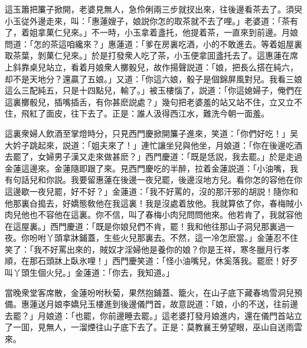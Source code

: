 這玉簫把簾子掀開，老婆見無人，急伶俐兩三步就扠出來，往後邊看茶去了。須臾小玉従外邊走來，叫：「惠蓮嫂子，娘説你怎的取茶就不去了哩。」老婆道：「茶有了，着姐拿菓仁兒來。」不一時，小玉拿着盞托，他提着茶，一直來到前邊。月娘問道：「怎的茶這咱纔來？」惠蓮道：「爹在房裏吃酒，小的不敢進去。等着姐屋裏取茶葉，剝菓仁兒來。」於是打發衆人吃了茶，小玉便拿囬盞托去了。這惠蓮在席上斜靠桌兒站立，看着月娘衆人擲骰兒，故作揚聲説道：「娘，把長么搭在純六，却不是天地分？還贏了五娘。」又道：「你這六娘，骰子是個錦屏風對兒。我看三娘這么三配純五，只是十四點兒，輸了。」被玉樓惱了，説道：「你這媳婦子，俺們在這裏擲骰兒，插嘴插舌，有你甚麽説處？」幾句把老婆羞的站又站不住，立又立不住，飛紅了面皮，往下去了。正是：誰人汲得西江水，難洗今朝一面羞。

這裏衆婦人飲酒至掌燈時分，只見西門慶掀開簾子進來，笑道：「你們好吃！」吴大妗子跳起來，説道：「姐夫來了！」連忙讓坐兒與他坐，月娘道：「你在後邊吃酒去罷了，女婦男子漢又走來做甚麽？」西門慶道：「既是恁説，我去罷。」於是走過金蓮這邊來。金蓮隨即跟了來。見西門慶吃的半醉，拉着金蓮説道：「小油嘴，我有句話兒和你説。我要留惠蓮在後邊一夜兒罷，後邊沒地方兒。看你怎的容他在你這邊歇一夜兒罷，好不好？」金蓮道：「我不好罵的，沒的那汗邪的胡説！隨你和他那裏㒲搗去，好嬌態敎他在我這裏！我是沒處着放他。我就算依了你，春梅賊小肉兒他也不容他在這裏。你不信，叫了春梅小肉兒問問他來。他若肯了，我就容他在這屋裏。」西門慶道：「既是你娘兒們不肯，罷！我和他往那山子洞兒那裏過一夜。你吩咐丫頭拿牀鋪蓋，生些火兒那裏去。不然，這一冷怎麽當。」金蓮忍不住笑了：「我不好罵出來的，賊奴才淫婦他是養你的娘？你是王祥，寒冬臘月行孝順，在那石頭牀上臥氷哩！」西門慶笑道：「怪小油嘴兒，休奚落我。罷麽！好歹叫丫頭生個火兒。」金蓮道：「你去，我知道。」

當晚衆堂客席散，金蓮吩咐秋菊，果然抱鋪蓋、籠火，在山子底下藏春塢雪洞兒預備。惠蓮送月娘李嬌兒玉樓進到後邊儀門首，故意説道：「娘，小的不送，往前邊去罷？」月娘道：「也罷，你前邊睡去罷。」這老婆打發月娘進内，還在儀門首站立了一囬，見無人，一溜煙往山子底下去了。正是：莫教襄王勞望眼，巫山自送雨雲來。

